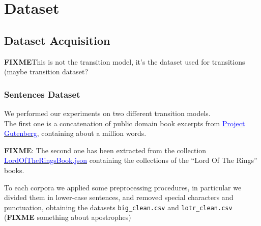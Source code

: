 \chapter{Dataset}

\section{Dataset Acquisition}
\label{section:dataset-exploration}

\textbf{FIXME}{This is not the transition model, it's the dataset used for transitions (maybe transition dataset?}
\subsection{Sentences Dataset}
\label{subsection:sencences_ds}
We performed our experiments on two different transition models.\\
The first one is a concatenation of public domain book excerpts from 
\href{http://www.gutenberg.org/wiki/Main\_Page}{ 
	\textcolor{blue}{Project Gutenberg}}, containing about a million words. 

\textbf{FIXME}:{
The second one has been extracted from the collection  
\href{https://www.kaggle.com/mokosan/lord-of-the-rings-character-data#LordOfTheRingsBook.json}{ 
	\textcolor{blue}{LordOfTheRingsBook.json}} containing the collections of the “Lord Of The Rings” books.}

To each corpora we applied some preprocessing procedures, in particular we divided them in lower-case 
sentences, and removed special characters and punctuation, obtaining the datasets \texttt{big\_clean.csv} and 
\texttt{lotr\_clean.csv} (\textbf{FIXME }something about apostrophes)


